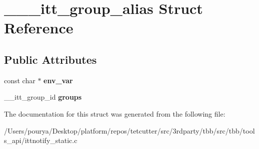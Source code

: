 \hypertarget{struct______itt__group__alias}{}\section{\+\_\+\+\_\+\+\_\+itt\+\_\+group\+\_\+alias Struct Reference}
\label{struct______itt__group__alias}
\subsection*{Public Attributes}
\begin{DoxyCompactItemize}
\item 
\hypertarget{struct______itt__group__alias_a81ff6c9390e517806319fab580899de4}{}const char $\ast$ {\bfseries env\+\_\+var}\label{struct______itt__group__alias_a81ff6c9390e517806319fab580899de4}

\item 
\hypertarget{struct______itt__group__alias_a6ea6f53acf7e9d24b01b81243ecd94d6}{}\+\_\+\+\_\+itt\+\_\+group\+\_\+id {\bfseries groups}\label{struct______itt__group__alias_a6ea6f53acf7e9d24b01b81243ecd94d6}

\end{DoxyCompactItemize}


The documentation for this struct was generated from the following file\+:\begin{DoxyCompactItemize}
\item 
/\+Users/pourya/\+Desktop/platform/repos/tetcutter/src/3rdparty/tbb/src/tbb/tools\+\_\+api/ittnotify\+\_\+static.\+c\end{DoxyCompactItemize}
